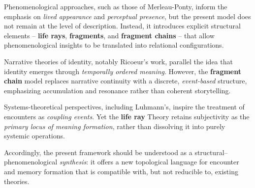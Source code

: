 Phenomenological approaches, such as those of Merleau-Ponty, inform the emphasis on \textit{lived appearance} and \textit{perceptual presence}, but the present model
does not remain at the level of description. Instead, it introduces explicit structural elements -- \textbf{life rays}, \textbf{fragments},
and \textbf{fragment chains} -- that allow phenomenological insights to be translated into relational configurations.

Narrative theories of identity, notably Ricoeur’s work, parallel the idea that identity emerges through \textit{temporally ordered meaning}. However,
the \textbf{fragment chain} model replaces narrative continuity with a discrete, \textit{event-based} structure, emphasizing accumulation and resonance rather than
coherent storytelling.

Systems-theoretical perspectives, including Luhmann’s, inspire the treatment of encounters as \textit{coupling events}. Yet the \textbf{life ray} Theory
retains subjectivity as the \textit{primary locus of meaning formation}, rather than dissolving it into purely systemic operations.

Accordingly, the present framework should be understood as a structural–phenomenological \textit{synthesis}: it offers a new topological
language for encounter and memory formation that is compatible with, but not reducible to, existing theories.
